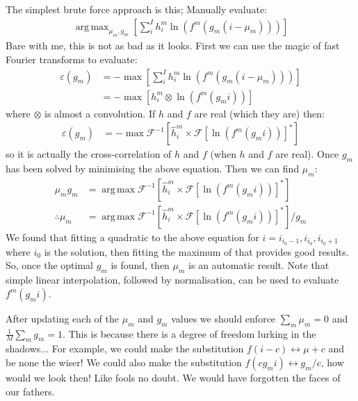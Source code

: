 \documentclass[11pt]{article}
\DeclareMathOperator*{\argmax}{arg\,max}
\begin{document}
The simplest brute force approach is this; Manually evaluate:
\begin{align}
   \argmax_{\mu_m, g_m}\left[ \sum_i^I h^m_i \ln(f^m(g_m (i - \mu_m))) \right]
\end{align}  
Bare with me, this is not as bad as it looks. First we can use the magic of fast Fourier transforms to evaluate:
\begin{align}
   \varepsilon(g_m) &= -\max\left[ \sum_i^I h^m_i \ln(f^m(g_m (i - \mu_m))) \right] \\
   &= -\max\left[ h^m_i \otimes \ln(f^m(g_m i)) \right] 
\end{align}  
where $\otimes$ is almost a convolution. If $h$ and $f$ are real (which they are) then:
\begin{align}
   \varepsilon(g_m) &= -\max\mathcal{F}^{-1}\left[ \hat{h}^m_i \times \mathcal{F}[\ln(f^m(g_m i))]^* \right] 
\end{align}  
so it is actually the cross-correlation of $h$ and $f$ (when $h$ and $f$ are real). Once $g_m$ has been solved by minimising the above equation. Then we can find $\mu_m$:
\begin{align}
   \mu_m g_m &= \argmax\mathcal{F}^{-1}\left[ \hat{h}^m_i \times \mathcal{F}[\ln(f^m(g_m i))]^* \right] \\
   \therefore \mu_m &= \argmax\mathcal{F}^{-1}\left[ \hat{h}^m_i \times \mathcal{F}[\ln(f^m(g_m i))]^* \right] / g_m
\end{align}  
We found that fitting a quadratic to the above equation for $i = i_{i_0-1}, i_{i_0}, i_{i_0+1}$ where $i_0$ is the solution, then fitting the maximum of that provides good results. 
So, once the optimal $g_m$ is found, then $\mu_m$ is an automatic result. Note that simple linear interpolation, followed by normalisation, can be used to evaluate $f^m(g_m i)$.  

After updating each of the $\mu_m$ and $g_m$ values we should enforce $\sum_m \mu_m = 0$ and $\frac{1}{M}\sum_m g_m = 1$. This is because there is a degree of freedom lurking in the shadows... For example, we could make the substitution $f(i - c) \leftrightarrow \mu + c$ and be none the wiser! We could also make the substitution $f(c g_m i) \leftrightarrow g_m / c$, how would we look then! Like fools no doubt. We would have forgotten the faces of our fathers. 
 
 
 
 
 
 
 
 
 
 
 
\end{document}
